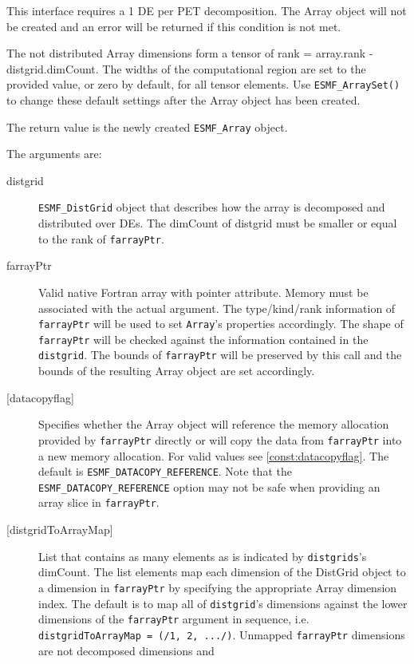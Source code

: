    This interface requires a 1 DE per PET decomposition. The Array object will 
   not be created and an error will be returned if this condition is not met. 
   
   The not distributed Array dimensions form a tensor of rank = array.rank - 
   distgrid.dimCount. The widths of the computational region are set to 
   the provided value, or zero by default, for all tensor elements. Use 
   {\tt ESMF\_ArraySet()} to change these default settings after the 
   Array object has been created. 
   
   The return value is the newly created {\tt ESMF\_Array} object. 
   
   The arguments are: 
   \begin{description} 
   \item[distgrid] 
   {\tt ESMF\_DistGrid} object that describes how the array is decomposed and 
   distributed over DEs. The dimCount of distgrid must be smaller or equal 
   to the rank of {\tt farrayPtr}. 
   \item[farrayPtr] 
   Valid native Fortran array with pointer attribute. Memory must be 
   associated with the actual argument. The type/kind/rank information of 
   {\tt farrayPtr} will be used to set {\tt Array}'s properties 
   accordingly. The shape of {\tt farrayPtr} will be checked against the 
   information contained in the {\tt distgrid}. The bounds of 
   {\tt farrayPtr} will be preserved by this call and the bounds of the 
   resulting Array object are set accordingly. 
   \item[{[datacopyflag]}] 
   Specifies whether the Array object will reference the memory allocation 
   provided by {\tt farrayPtr} directly or will copy the data from 
   {\tt farrayPtr} into a new memory allocation. For valid values see 
   \ref{const:datacopyflag}. The default is {\tt ESMF\_DATACOPY\_REFERENCE}. 
   Note that the {\tt ESMF\_DATACOPY\_REFERENCE} option may not be safe 
   when providing an array slice in {\tt farrayPtr}. 
   \item[{[distgridToArrayMap]}] 
   List that contains as many elements as is indicated by 
   {\tt distgrids}'s dimCount. The list elements map each dimension of 
   the DistGrid object to a dimension in {\tt farrayPtr} by specifying the 
   appropriate Array dimension index. The default is to map all of 
   {\tt distgrid}'s dimensions against the lower dimensions of the 
   {\tt farrayPtr} argument in sequence, i.e. {\tt distgridToArrayMap = 
   (/1, 2, .../)}. 
   Unmapped {\tt farrayPtr} dimensions are not decomposed dimensions and 

\end{description}
